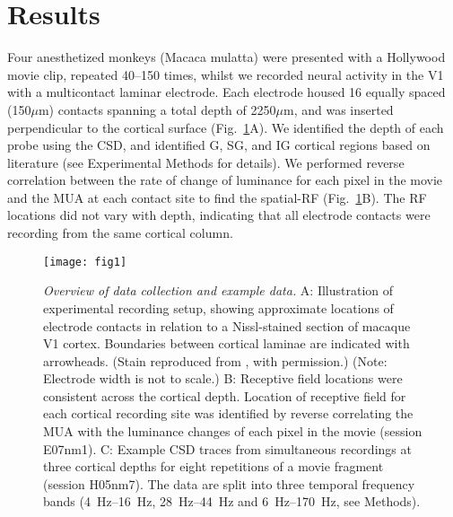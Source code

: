 \section{Results}
Four anesthetized monkeys (Macaca mulatta) were presented with a Hollywood movie clip, repeated 40--150 times, whilst we recorded neural activity in the \ac{V1} with a multicontact laminar electrode.
Each electrode housed 16 equally spaced (150\hspace{0.2em}$\mu$m) contacts spanning a total depth of 2250\hspace{0.2em}$\mu$m, and was inserted perpendicular to the cortical surface (Fig.~\ref{fig:lam_1}A).
We identified the depth of each probe using the \ac{CSD}, and identified \ac{G}, \ac{SG}, and \ac{IG} cortical regions based on literature (see Experimental Methods for details).
We performed reverse correlation between the rate of change of luminance for each pixel in the movie and the \ac{MUA} at each contact site to find the spatial-\ac{RF} (Fig.~\ref{fig:lam_1}B).
The \ac{RF} locations did not vary with depth, indicating that all electrode contacts were recording from the same cortical column.

\begin{figure}[htbp]
\centering \texttt{[image: fig1]}
%
\caption{%
\textit{Overview of data collection and example data.}
A: Illustration of experimental recording setup, showing approximate locations 
of electrode contacts in relation to a Nissl-stained section of macaque \ac{V1} 
cortex.
Boundaries between cortical laminae are indicated with arrowheads.
(Stain reproduced from \cite{Tyler1998}, with permission.) (Note: Electrode 
width is not to scale.)
B: Receptive field locations were consistent across the 
cortical depth.
Location of receptive field for each cortical recording site 
was identified by reverse 
correlating the \ac{MUA} with the luminance changes of each 
pixel in the movie (session E07nm1).
C: Example \ac{CSD} traces from simultaneous recordings at three cortical depths for eight 
repetitions of a movie fragment (session H05nm7).
The data are split into three temporal frequency bands (\SIrange{4}{16}{Hz}, \SIrange{28}{44}{Hz} and \SIrange{6}{170}{Hz}, see Methods).
}%
\label{fig:lam_1}
%
\end{figure}

